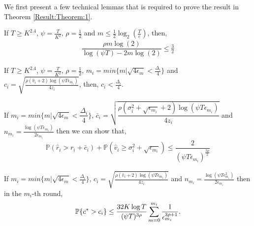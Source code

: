 We first present a few technical lemmas that is required  to prove the result in Theorem \ref{Result:Theorem:1}.

\begin{lemma}
\label{proofTheorem:Lemma:1}
If $T\geq K^{2.4}$, $\psi=\frac{T}{ K^2}$, $\rho=\frac{1}{2}$ and $m\leq \frac{1}{2} \log_2\left(\frac{T}{e}\right) $, then,
\begin{align*}
\dfrac{\rho m \log(2)}{\log(\psi T) - 2m\log( 2)} \leq \frac{3}{2}
\end{align*}
\end{lemma}



\begin{lemma}
\label{proofTheorem:Lemma:2}
If $T\geq K^{2.4}$, $\psi=\frac{T}{ K^2}$, $\rho =\frac{1}{2}$, $m_i = min\lbrace m|\sqrt{4\epsilon_{m} } < \frac{\Delta_i}{4} \rbrace $ and $c_{i} =\sqrt{\frac{\rho (\hat{v}_i + 2)\log (\psi T\epsilon_{m_{i}})}{4 z_i}}$, then, $c_{i} < \frac{\Delta_i}{4}$.
\end{lemma}



\begin{lemma}
\label{proofTheorem:Lemma:3}
If $m_i = min\lbrace m|\sqrt{4\epsilon_{m} } < \dfrac{\Delta_i}{4} \rbrace $,  $\bar{c}_i=\sqrt{\dfrac{\rho (\sigma_{i}^{2}+\sqrt{\epsilon_{m_{i}}} + 2)\log(\psi T\epsilon_{m_{i}})}{4z_i}}$ and $n_{m_i} = \frac{\log{(\psi T\epsilon_{m_{i}})}}{2\epsilon_{m_{i}}}$ then we can show that,
\begin{align*}
\mathbb{P}\left( \hat{r}_{i} > r_{i}+ \bar{c}_i\right) 
+ \mathbb{P}\left( \hat{v}_{i}\geq \sigma_{i}^{2}+\sqrt{\epsilon_{m_{i}}}\right) \leq \dfrac{2}{(\psi  T\epsilon_{m_{i}})^{\frac{3\rho}{2}}}
\end{align*}
\end{lemma}



\begin{lemma}
\label{proofTheorem:Lemma:4}
If $m_i = min\lbrace m|\sqrt{4\epsilon_{m} } < \frac{\Delta_i}{4} \rbrace $, $c_{i} =\sqrt{\frac{\rho(\hat{v}_i + 2)\log (\psi T\epsilon_{m_{i}})}{4 z_{i}}}$ and $n_{m_i}=\frac{\log{(\psi T\epsilon_{m_{i}}^{2})}}{2\epsilon_{m_{i}}}$ then in the $m_i$-th round, 
\begin{align*}
\mathbb{P}\lbrace c^{*} > c_i \rbrace \leq \dfrac{32K\log T}{(\psi T)^{3\rho}}\sum_{m=0}^{m_i}\dfrac{1}{\epsilon_{m_i}^{3\rho + 1}}. 
\end{align*}
\end{lemma}



